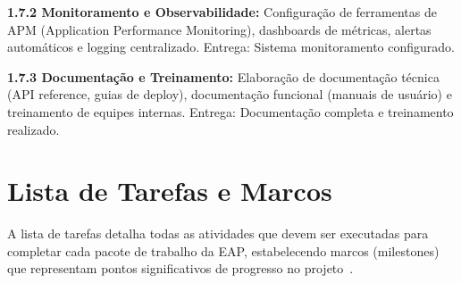 \textbf{1.7.2 Monitoramento e Observabilidade:} Configuração de ferramentas de APM (Application Performance Monitoring), dashboards de métricas, alertas automáticos e logging centralizado. Entrega: Sistema monitoramento configurado.

\textbf{1.7.3 Documentação e Treinamento:} Elaboração de documentação técnica (API reference, guias de deploy), documentação funcional (manuais de usuário) e treinamento de equipes internas. Entrega: Documentação completa e treinamento realizado.

\section{Lista de Tarefas e Marcos}

A lista de tarefas detalha todas as atividades que devem ser executadas para completar cada pacote de trabalho da EAP, estabelecendo marcos (milestones) que representam pontos significativos de progresso no projeto~\cite{Kerzner:2022}.

